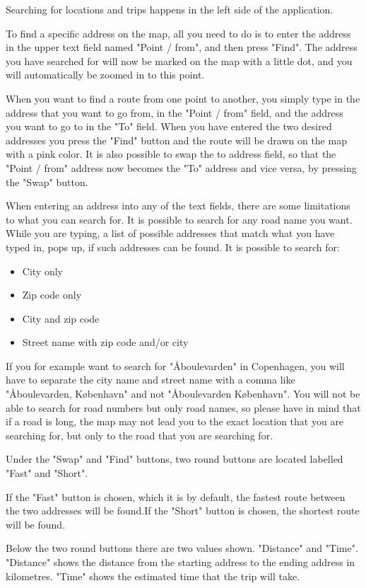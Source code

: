 Searching for locations and trips happens in the left side of the application.

To find a specific address on the map, all you need to do is to enter the address in the upper text field named "Point / from", and then press "Find". The address you have searched for will now be marked on the map with a little dot, and you will automatically be zoomed in to this point.

When you want to find a route from one point to another, you simply type in the address that you want to go from, in the "Point / from" field, and the address you want to go to in the "To" field. When you have entered the two desired addresses you press the "Find" button and the route will be drawn on the map with a pink color. 
It is also possible to swap the to address field, so that the "Point / from" address now becomes the "To" address and vice versa, by pressing the "Swap" button.

When entering an address into any of the text fields, there are some limitations to what you can search for. It is possible to search for any road name you want. While you are typing, a list of possible addresses that match what you have typed in, pops up, if such addresses can be found. It is possible to search for:
\begin{itemize}
	\item City only
	\item Zip code only
	\item City and zip code
	\item Street name with zip code and/or city
\end{itemize}
If you for example want to search for "\AA boulevarden" in Copenhagen, you will have to separate the city name and street name with a comma like "\AA boulevarden, K\o benhavn" and not "\AA boulevarden K\o benhavn". You will not be able to search for road numbers but only road names, so please have in mind that if a road is long, the map may not lead you to the exact location that you are searching for, but only to the road that you are searching for.

Under the "Swap" and "Find" buttons, two round buttons are located labelled "Fast" and "Short".

If the "Fast" button is chosen, which it is by default, the fastest route between the two addresses will be found.If the "Short" button is chosen, the shortest route will be found.

Below the two round buttons there are two values shown. "Distance" and "Time". "Distance" shows the distance from the starting address to the ending address in kilometres. "Time" shows the estimated time that the trip will take.

